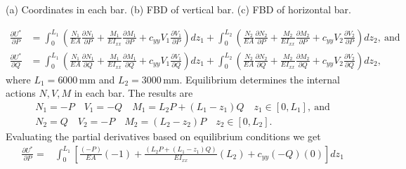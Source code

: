 \documentclass{AeroStructure-ERJohnson}
\begin{document}
\begin{example}
{\caption{(a) Coordinates in each bar. (b) FBD of vertical bar. (c) FBD of horizontal bar.}\label{fig6.16}}

\vspace*{-1.5pc}

\begin{align*}
\frac{\partial U^{*}}{\partial P}&=\int_{0}^{L_{1}}\left(\frac{N_{1}}{E A} \frac{\partial N_{1}}{\partial P}+\frac{M_{1}}{E I_{x x}} \frac{\partial M_{1}}{\partial P}+c_{y y} V_{1} \frac{\partial V_{1}}{\partial P}\right) d z_{1}+\int_{0}^{L_{2}}\left(\frac{N_{2}}{E A} \frac{\partial N_{2}}{\partial P}+\frac{M_{2}}{E I_{x x}} \frac{\partial M_{2}}{\partial P}+c_{y y} V_{2} \frac{\partial V_{2}}{\partial P}\right) d z_{2},\ \text{and}\tag{c}\\
\frac{\partial U^{*}}{\partial Q}&=\int_{0}^{L_{1}}\left(\frac{N_{1}}{E A} \frac{\partial N_{1}}{\partial Q}+\frac{M_{1}}{E I_{x x}} \frac{\partial M_{1}}{\partial Q}+c_{y y} V_{1} \frac{\partial V_{1}}{\partial Q}\right) d z_{1}+\int_{0}^{L_{2}}\left(\frac{N_{2}}{E A} \frac{\partial N_{2}}{\partial Q}+\frac{M_{2}}{E I_{x x}} \frac{\partial M_{2}}{\partial Q}+c_{y y} V_{2} \frac{\partial V_{2}}{\partial Q}\right) d z_{2},\tag{d}
\end{align*}
\noindent where $L_{1}=6000\,\mathrm{mm}$ and $L_{2}=3000\,\mathrm{mm}$. Equilibrium determines the internal actions $N, V, M$ in each bar. The results are
\begin{align*}
&N_{1}=-P \quad V_{1}=-Q \quad M_{1}=L_{2} P+\left(L_{1}-z_{1}\right) Q \quad z_{1} \in\left[0, L_{1}\right],\ \text{and}&\tag{e}\\
&N_{2}=Q \quad V_{2}=-P \quad M_{2}=\left(L_{2}-z_{2}\right) P \quad z_{2} \in\left[0, L_{2}\right].&\tag{f}
\end{align*}
Evaluating the partial derivatives based on equilibrium conditions we get
\begin{align*}
\frac{\partial U^{*}}{\partial P}=& \int_{0}^{L_{1}}\left[\frac{(-P)}{E A}(-1)+\frac{\left(L_{2} P+\left(L_{1}-z_{1}\right) Q\right)}{E I_{x x}}\left(L_{2}\right)+c_{y y}(-Q)(0)\right] d z_{1}\\

\end{align*}
\end{example}
\end{document}
